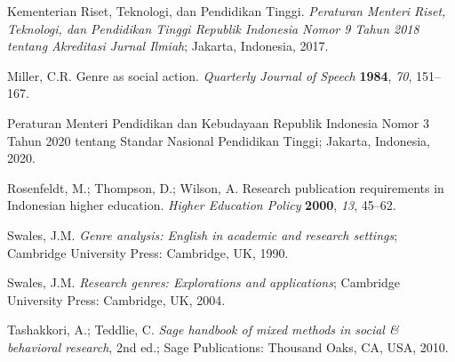 \documentclass[journal,article,submit,pdftex,moreauthors]{Definitions/mdpi}
\begin{document}
\begin{thebibliography}{999}
 Kementerian Riset, Teknologi, dan Pendidikan Tinggi. \textit{Peraturan Menteri Riset, Teknologi, dan Pendidikan Tinggi Republik Indonesia Nomor 9 Tahun 2018 tentang Akreditasi Jurnal Ilmiah}; Jakarta, Indonesia, 2017.

 Miller, C.R. Genre as social action. \textit{Quarterly Journal of Speech} \textbf{1984}, \textit{70}, 151--167.

 Peraturan Menteri Pendidikan dan Kebudayaan Republik Indonesia Nomor 3 Tahun 2020 tentang Standar Nasional Pendidikan Tinggi; Jakarta, Indonesia, 2020.

 Rosenfeldt, M.; Thompson, D.; Wilson, A. Research publication requirements in Indonesian higher education. \textit{Higher Education Policy} \textbf{2000}, \textit{13}, 45--62.

 Swales, J.M. \textit{Genre analysis: English in academic and research settings}; Cambridge University Press: Cambridge, UK, 1990.

 Swales, J.M. \textit{Research genres: Explorations and applications}; Cambridge University Press: Cambridge, UK, 2004.

 Tashakkori, A.; Teddlie, C. \textit{Sage handbook of mixed methods in social \& behavioral research}, 2nd ed.; Sage Publications: Thousand Oaks, CA, USA, 2010.

\end{thebibliography}
\end{document}
